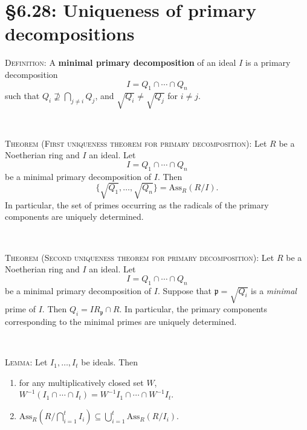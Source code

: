 \documentclass[12pt]{amsart}
\newcommand{\p}{\mathfrak{p}}
\newcommand{\Ass}{\mathrm{Ass}}
\renewcommand{\1}{\mathbbm{1}}
\newcommand{\showsol}[1]{\def\displaysol{#1}}
\begin{document}
\showsol{0}
	
	\thispagestyle{empty}
	
	\section*{\S6.28: Uniqueness of primary decompositions}
	
	\begin{framed}

\noindent \textsc{Definition:} A \textbf{minimal primary decomposition} of an ideal $I$ is a primary decomposition
\[ I = Q_1 \cap \cdots \cap Q_n\]
such that $Q_i \not\supseteq \bigcap_{j\neq i} Q_j$, and $\sqrt{Q_i} \neq \sqrt{Q_j}$ for $i\neq j$.

\

\noindent \textsc{Theorem (First uniqueness theorem for primary decomposition):} Let $R$ be a Noetherian ring and $I$ an ideal. Let \[I = Q_1 \cap \cdots \cap Q_n\] be a minimal primary decomposition of $I$. Then \[\{ \sqrt{Q_1},\dots,\sqrt{Q_n} \} = \Ass_R(R/I).\]
In particular, the set of primes occurring as the radicals of the primary components are uniquely determined.


\

\noindent \textsc{Theorem (Second uniqueness theorem for primary decomposition):} Let $R$ be a Noetherian ring and $I$ an ideal. Let \[I = Q_1 \cap \cdots \cap Q_n\] be a minimal primary decomposition of $I$. Suppose that $\p =\sqrt{Q_i}$ is a \emph{minimal} prime of $I$. Then $Q_i = I R_{\p} \cap R$.
In particular, the primary components corresponding to the minimal primes are uniquely determined.


\

\noindent \textsc{Lemma:} Let $I_1,\dots,I_t$ be ideals. Then
\begin{enumerate}
\item for any multiplicatively closed set $W$, $W^{-1}(I_1 \cap \cdots \cap I_t) = W^{-1} I_1 \cap \cdots \cap W^{-1}I_t$.
\item $\Ass_R\left(R/\bigcap_{i=1}^t I_i\right) \subseteq \bigcup_{i=1}^t \Ass_R(R/I_i)$.
\end{enumerate}
\end{framed}
\end{document}
